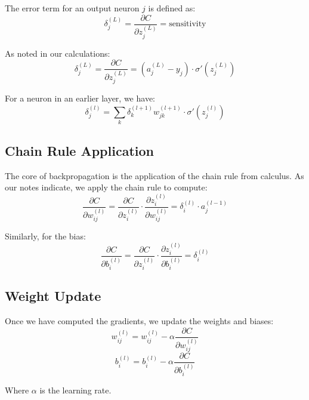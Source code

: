 The error term for an output neuron $j$ is defined as:
\begin{equation}
\delta_j^{(L)} = \frac{\partial C}{\partial z_j^{(L)}} = \text{sensitivity}
\end{equation}

As noted in our calculations:
\begin{equation}
\delta_j^{(L)} = \frac{\partial C}{\partial z_j^{(L)}} = (a_j^{(L)} - y_j) \cdot \sigma'(z_j^{(L)})
\end{equation}

For a neuron in an earlier layer, we have:
\begin{equation}
\delta_j^{(l)} = \sum_k \delta_k^{(l+1)} w_{jk}^{(l+1)} \cdot \sigma'(z_j^{(l)})
\end{equation}

\subsection{Chain Rule Application}
The core of backpropagation is the application of the chain rule from calculus. As our notes indicate, we apply the chain rule to compute:
\begin{equation}
\frac{\partial C}{\partial w_{ij}^{(l)}} = \frac{\partial C}{\partial z_i^{(l)}} \cdot \frac{\partial z_i^{(l)}}{\partial w_{ij}^{(l)}} = \delta_i^{(l)} \cdot a_j^{(l-1)}
\end{equation}

Similarly, for the bias:
\begin{equation}
\frac{\partial C}{\partial b_i^{(l)}} = \frac{\partial C}{\partial z_i^{(l)}} \cdot \frac{\partial z_i^{(l)}}{\partial b_i^{(l)}} = \delta_i^{(l)}
\end{equation}

\subsection{Weight Update}
Once we have computed the gradients, we update the weights and biases:
\begin{equation}
w_{ij}^{(l)} = w_{ij}^{(l)} - \alpha \frac{\partial C}{\partial w_{ij}^{(l)}}
\end{equation}
\begin{equation}
b_i^{(l)} = b_i^{(l)} - \alpha \frac{\partial C}{\partial b_i^{(l)}}
\end{equation}

Where $\alpha$ is the learning rate.

